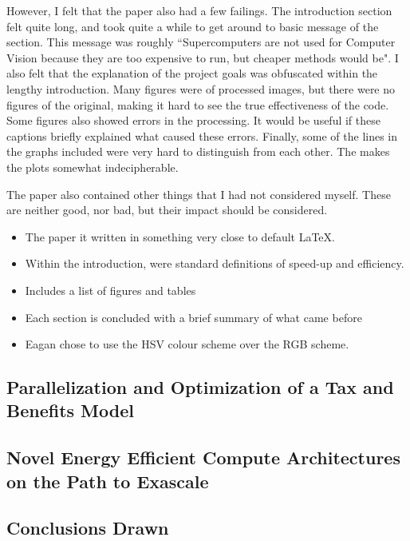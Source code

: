   However, I felt that the paper also had a few failings.
  The introduction section felt quite long, and took quite a while to get around to basic message of the section.
  This message was roughly ``Supercomputers are not used for Computer Vision because they are too expensive to run, but cheaper methods would be".
  I also felt that the explanation of the project goals was obfuscated within the lengthy introduction.
  Many figures were of processed images, but there were no figures of the original, making it hard to see the true effectiveness of the code.
  Some figures also showed errors in the processing.
  It would be useful if these captions briefly explained what caused these errors.
  Finally, some of the lines in the graphs included were very hard to distinguish from each other.
  The makes the plots somewhat indecipherable.  

  The paper also contained other things that I had not considered myself.
  These are neither good, nor bad, but their impact should be considered.
  \begin{itemize}
    \item The paper it written in something very close to default \LaTeX.
    \item Within the introduction, were standard definitions of speed-up and efficiency.
    \item Includes a list of figures and tables
    \item Each section is concluded with a brief summary of what came before
    \item Eagan chose to use the HSV colour scheme over the RGB scheme.
  \end{itemize}
\subsection{Parallelization and Optimization of a Tax and Benefits Model}
\subsection{Novel Energy Efficient Compute Architectures on the Path to Exascale}
\subsection{Conclusions Drawn}
